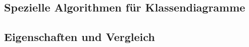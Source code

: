 

\subsection{Spezielle Algorithmen für Klassendiagramme}







\subsection{Eigenschaften und Vergleich}






